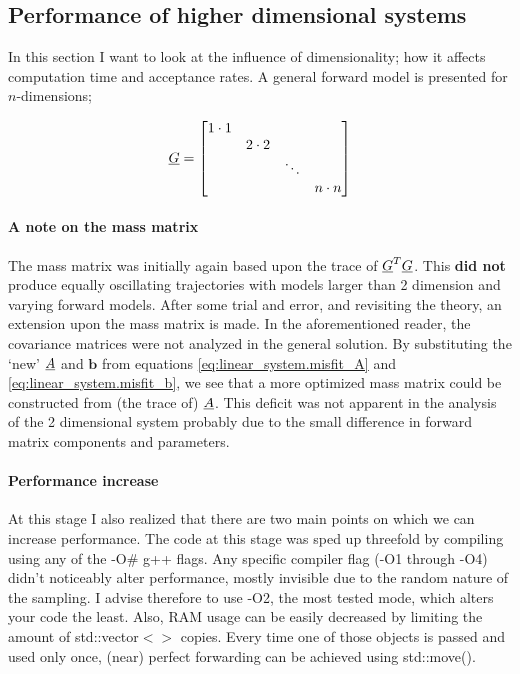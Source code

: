 \subsection{Performance of higher dimensional systems}

In this section I want to look at the influence of dimensionality; how it affects computation time and acceptance rates. A general forward model is presented for $n$-dimensions;

\begin{gather}
	\underline{G} =
	\begin{bmatrix}
		1\cdot 1 &   &        & \\
		  & 2\cdot 2 &        & \\
		  &   & \ddots & \\
		  &   &        & n \cdot n
	\end{bmatrix}
\end{gather}
\paragraph{A note on the mass matrix}The mass matrix was initially again based upon the trace of $\underline{G}^T\underline{G}$. This \textbf{did not} produce equally oscillating trajectories with models larger than 2 dimension and varying forward models. After some trial and error, and revisiting the theory, an extension upon the mass matrix is made. In the aforementioned reader, the covariance matrices were not analyzed in the general solution. By substituting the `new' $\underline{A}$ and $\mathbf{b}$ from equations \eqref{eq:linear_system.misfit_A} and \eqref{eq:linear_system.misfit_b}, we see that a more optimized mass matrix could be constructed from (the trace of) $\underline{A}$. This deficit was not apparent in the analysis of the 2 dimensional system probably due to the small difference in forward matrix components and parameters.

\paragraph{Performance increase}At this stage I also realized that there are two main points on which we can increase performance. The code at this stage was sped up threefold by compiling using any of the -O\# g++ flags. Any specific compiler flag (-O1 through -O4) didn't noticeably alter performance, mostly invisible due to the random nature of the sampling. I advise therefore to use -O2, the most tested mode, which alters your code the least. Also, RAM usage can be easily decreased by limiting the amount of std::vector$<>$ copies. Every time one of those objects is passed and used only once, (near) perfect forwarding can be achieved using std::move().



